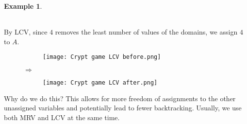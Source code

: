 \documentclass{article}
\theoremstyle{definition}
\newtheorem{example}{Example}[definition]
\begin{document}
\begin{example}
\begin{figure}[h!]
	\end{figure}\\
	By LCV, since $4$ removes the least number of values of the domains, we assign $4$ to $A$.
	\begin{figure}[h!]
		\centering
		\begin{subfigure}[h]{0.2\textwidth}
			\texttt{[image: Crypt game LCV before.png]}
		\end{subfigure}
		$\Longrightarrow$
		\begin{subfigure}[h]{0.2\textwidth}
			\texttt{[image: Crypt game LCV after.png]}
		\end{subfigure}
	\end{figure}
\end{example}
Why do we do this? This allows for more freedom of assignments to the other unassigned variables and potentially lead to fewer backtracking. Usually, we use both MRV and LCV at the same time.

\newpage
\end{document}
